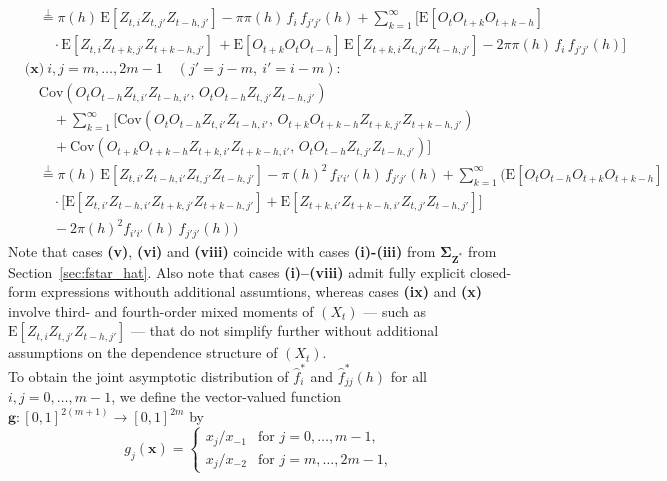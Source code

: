 ﻿\documentclass[12pt,a4paper]{scrreprt}
\theoremstyle{definition}
\begin{document}
{\begin{align*}
&\quad \overset{\perp}{=}
\pi(h)\,\mathrm{E}[Z_{t,i}Z_{t,j'}Z_{t-h,j'}] 
- \pi\pi(h)\,f_i\,f_{j'j'}(h) 
 + \sum_{k=1}^{\infty}\bigl[
\mathrm{E}[O_tO_{t+k}O_{t+k-h}]\\
&\qquad \cdot\mathrm{E}[Z_{t,i}Z_{t+k, j'}Z_{t+k-h, j'}] \,
 + \mathrm{E}[O_{t+k}O_tO_{t-h}]\,
\mathrm{E}[Z_{t+k,i}Z_{t,j'}Z_{t-h, j'}] 
- 2\pi\pi(h)\,f_i\,f_{j'j'}(h)\bigr]\\[2ex]
%
&\textbf{(x)}\ i,j = m, \ldots, 2m-1 \quad (j'=j-m,~ i' = i-m): \\
&\quad \mathrm{Cov}(O_tO_{t-h}Z_{t,i'}Z_{t-h,i'},\, 
O_t O_{t-h}Z_{t,j'}Z_{t-h,j'}) \\
&\qquad + \sum_{k=1}^{\infty}\bigl[
\mathrm{Cov}(O_tO_{t-h}Z_{t,i'}Z_{t-h,i'},\, 
O_{t+k}O_{t+k-h}Z_{t+k, j'}Z_{t+k-h, j'}) \\
&\qquad + \mathrm{Cov}(O_{t+k}O_{t+k-h}Z_{t+k, i'}Z_{t+k-h, i'},\, 
O_tO_{t-h}Z_{t, j'}Z_{t-h, j'})\bigr] \\
&\quad \overset{\perp}{=}
\pi(h)\,\mathrm{E}[Z_{t,i'}Z_{t-h, i'}Z_{t, j'}Z_{t-h, j'}] 
- \pi(h)^2\,f_{i'i'}(h)\,f_{j'j'}(h) + \sum_{k=1}^{\infty} \biggl(
\mathrm{E}[O_tO_{t-h}O_{t+k}O_{t+k-h}]\\ 
& \qquad \cdot \biggl[\mathrm{E}[Z_{t,i'}Z_{t-h, i'}Z_{t+k, j'}Z_{t+k-h, j'}] 
+ \mathrm{E}[Z_{t+k, i'}Z_{t+k-h, i'}Z_{t, j'}Z_{t-h, j'}]\biggr]\\
&\qquad - 2\pi(h)^2 f_{i'i'}(h)\,f_{j'j'}(h)\biggr)
\end{align*}}\noindent
Note that cases \textbf{(v)}, \textbf{(vi)} and \textbf{(viii)} coincide with cases 
\textbf{(i)-(iii)} from \hyperref[cal:Sigma_Z]{$\boldsymbol{\Sigma}_{\boldsymbol{Z}^*}$} from Section~\ref{sec:fstar_hat}. 
Also note that cases \textbf{(i)--(viii)} admit fully explicit closed-form 
expressions withouth additional assumtions, whereas cases \textbf{(ix)} and \textbf{(x)} involve 
third- and fourth-order mixed moments of $(X_t)$ — such as 
$\mathrm{E}[Z_{t,i}Z_{t,j'}Z_{t-h, j'}]$ — that do not simplify 
further without additional assumptions on the dependence structure 
of $(X_t)$.\\
To obtain the joint asymptotic distribution of $\hat{f}^*_i$ and 
$\hat{f}^*_{jj}(h)$ for all $i,j = 0,\ldots,m-1$, we define the 
vector-valued function $\boldsymbol{g}\colon [0,1]^{2(m+1)} \to 
[0,1]^{2m}$ by
\[
    g_j(\boldsymbol{x}) = \begin{cases}
        x_j / x_{-1} & \text{for } j = 0,\ldots,m-1, \\
        x_j / x_{-2} & \text{for } j = m,\ldots,2m-1,
    \end{cases}
\]
\end{document}
